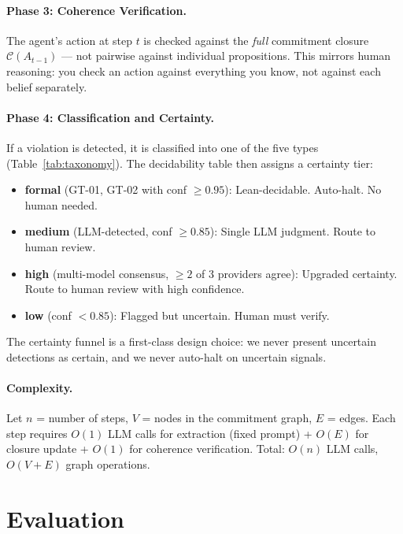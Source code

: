 \documentclass[11pt]{article}
\newcommand{\C}{\mathcal{C}}      %
\begin{document}
\paragraph{Phase 3: Coherence Verification.}
The agent's action at step $t$ is checked against the \emph{full} commitment
closure $\C(A_{t-1})$ — not pairwise against individual propositions.
This mirrors human reasoning: you check an action against everything you
know, not against each belief separately.

\paragraph{Phase 4: Classification and Certainty.}
If a violation is detected, it is classified into one of the five types
(Table~\ref{tab:taxonomy}). The decidability table then assigns a certainty
tier:

\begin{itemize}
  \item \textbf{formal} (GT-01, GT-02 with conf $\geq 0.95$): Lean-decidable.
    Auto-halt. No human needed.
  \item \textbf{medium} (LLM-detected, conf $\geq 0.85$): Single LLM judgment.
    Route to human review.
  \item \textbf{high} (multi-model consensus, $\geq 2$ of 3 providers agree):
    Upgraded certainty. Route to human review with high confidence.
  \item \textbf{low} (conf $< 0.85$): Flagged but uncertain. Human must verify.
\end{itemize}

The certainty funnel is a first-class design choice: we never present
uncertain detections as certain, and we never auto-halt on uncertain signals.

\paragraph{Complexity.}
Let $n$ = number of steps, $V$ = nodes in the commitment graph,
$E$ = edges. Each step requires $O(1)$ LLM calls for extraction (fixed
prompt) + $O(E)$ for closure update + $O(1)$ for coherence verification.
Total: $O(n)$ LLM calls, $O(V+E)$ graph operations.

\section{Evaluation}
\label{sec:eval}
\end{document}
